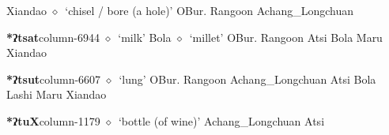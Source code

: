 \hspace{1ex}
         Xiandao 
\hspace{1ex}
         $\diamond$~`chisel / bore (a hole)'
         OBur. 
\hspace{1ex}
         Rangoon 
\hspace{1ex}
         Achang\_Longchuan 
  \item {\footnotesize \textbf{*ʔtsat}}{\tiny column-6944}
         $\diamond$~`milk'
         Bola 
\hspace{1ex}
         $\diamond$~`millet'
         OBur. 
\hspace{1ex}
         Rangoon 
\hspace{1ex}
         Atsi 
\hspace{1ex}
         Bola 
\hspace{1ex}
         Maru 
\hspace{1ex}
         Xiandao 
  \item {\footnotesize \textbf{*ʔtsut}}{\tiny column-6607}
         $\diamond$~`lung'
         OBur. 
\hspace{1ex}
         Rangoon 
\hspace{1ex}
         Achang\_Longchuan 
\hspace{1ex}
         Atsi 
\hspace{1ex}
         Bola 
\hspace{1ex}
         Lashi 
\hspace{1ex}
         Maru 
\hspace{1ex}
         Xiandao 
  \item {\footnotesize \textbf{*ʔtuX}}{\tiny column-1179}
         $\diamond$~`bottle (of wine)'
         Achang\_Longchuan 
\hspace{1ex}
         Atsi 
\hspace{1ex}
